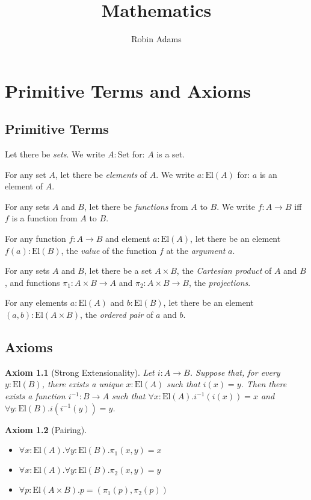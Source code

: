 \documentclass{book}
\title{Mathematics}
\author{Robin Adams}
\newtheorem{ax}{Axiom}[chapter]
\theoremstyle{definition}
\newcommand{\El}[1]{\ensuremath{\mathrm{El} \left( {#1} \right)}}
\newcommand{\inv}[1]{\ensuremath{{#1}^{-1}}}
\begin{document}
\maketitle
\tableofcontents

\chapter{Primitive Terms and Axioms}

\section{Primitive Terms} %

Let there be \emph{sets}. We write $A : \mathrm{Set}$ for: $A$ is a set.

For any set $A$, let there be \emph{elements} of $A$. We write $a: \El{A}$ for: $a$ is an element of $A$.

For any sets $A$ and $B$, let there be \emph{functions} from $A$ to $B$. We write $f : A \rightarrow B$ iff $f$ is a function from $A$ to $B$.

For any function $f : A \rightarrow B$ and element $a : \El{A}$, let there be an element $f(a) : \El{B}$, the \emph{value} of the function $f$ at the \emph{argument} $a$.

For any sets $A$ and $B$, let there be a set $A \times B$, the \emph{Cartesian product} of $A$ and $B$, and functions $\pi_1 : A \times B \rightarrow A$ and $\pi_2 : A \times B \rightarrow B$, the \emph{projections}.

For any elements $a : \El{A}$ and $b : \El{B}$, let there be an element $(a,b) : \El{A \times B}$, the \emph{ordered pair} of $a$ and $b$.

\section{Axioms} %

\begin{ax}[Strong Extensionality]
Let $i : A \rightarrow B$. Suppose that, for every $y: \El{B}$, there exists a unique $x : \El{A}$ such that $i(x) = y$. Then there exists a function $\inv{i} : B \rightarrow A$ such that $\forall x : \El{A}. \inv{i}(i(x)) = x$ and $\forall y : \El{B}. i(\inv{i}(y)) = y$.
\end{ax}

\begin{ax}[Pairing]$ $
\begin{itemize}
\item $\forall x : \El{A}. \forall y : \El{B}. \pi_1(x,y) = x$
\item $\forall x : \El{A}. \forall y : \El{B}. \pi_2(x,y) = y$
\item $\forall p : \El{A \times B}. p = (\pi_1(p), \pi_2(p))$
\end{itemize}
\end{ax}
\end{document}
